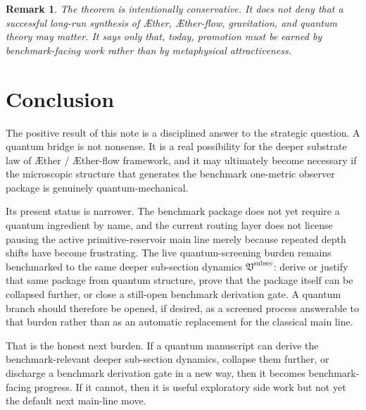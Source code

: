 \documentclass[11pt]{article}
\newcommand{\Aether}{\AE{}ther}
\newcommand{\Aflow}{\AE{}ther-flow}
\newcommand{\TheoryProgram}{\Aether{} / \Aflow{} framework}
\newcommand{\SubSectionPackage}{\mathfrak V^{\mathrm{subsec}}}
\newtheorem{remark}{Remark}
\begin{document}
\begin{remark}
The theorem is intentionally conservative. It does not deny that a successful long-run synthesis of \Aether{}, \Aflow{}, gravitation, and quantum theory may matter. It says only that, today, promotion must be earned by benchmark-facing work rather than by metaphysical attractiveness.
\end{remark}

\section{Conclusion}

The positive result of this note is a disciplined answer to the strategic question. A quantum bridge is not nonsense. It is a real possibility for the deeper substrate law of \TheoryProgram{}, and it may ultimately become necessary if the microscopic structure that generates the benchmark one-metric observer package is genuinely quantum-mechanical.

Its present status is narrower. The benchmark package does not yet require a quantum ingredient by name, and the current routing layer does not license pausing the active primitive-reservoir main line merely because repeated depth shifts have become frustrating. The live quantum-screening burden remains benchmarked to the same deeper sub-section dynamics \(\SubSectionPackage\): derive or justify that same package from quantum structure, prove that the package itself can be collapsed further, or close a still-open benchmark derivation gate. A quantum branch should therefore be opened, if desired, as a screened process answerable to that burden rather than as an automatic replacement for the classical main line.

That is the honest next burden. If a quantum manuscript can derive the benchmark-relevant deeper sub-section dynamics, collapse them further, or discharge a benchmark derivation gate in a new way, then it becomes benchmark-facing progress. If it cannot, then it is useful exploratory side work but not yet the default next main-line move.
\end{document}

